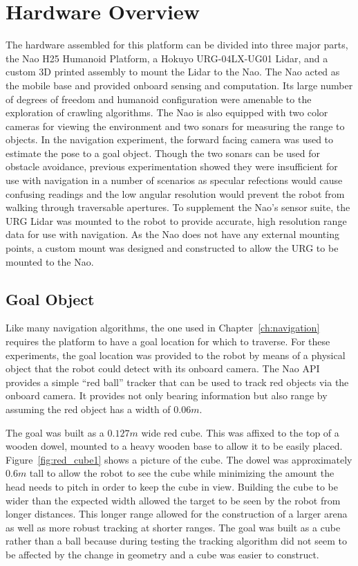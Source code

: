 \section{Hardware Overview}

The hardware assembled for this platform can be divided into three major parts,
the Nao H25 Humanoid Platform, a Hokuyo URG-04LX-UG01 Lidar, and a custom 3D
printed assembly to mount the Lidar to the Nao.
The Nao acted as the mobile base and provided onboard sensing and computation. 
Its large number of degrees of freedom and humanoid configuration were amenable
to the exploration of crawling algorithms.
The Nao is also equipped with two color cameras for viewing the environment
and two sonars for measuring the range to objects.
In the navigation experiment, the forward facing camera was used to estimate
the pose to a goal object. Though the two sonars can be used for obstacle
avoidance, previous experimentation showed they
were insufficient for use with navigation in a number of scenarios as
specular refections would cause confusing readings and the low angular
resolution would prevent the robot from walking through traversable apertures.
To supplement the Nao's sensor suite, the URG Lidar was mounted to the robot
to provide accurate, high resolution range data for use with navigation.
As the Nao does not have any external mounting points, a custom mount was
designed and constructed to allow the URG to be mounted to the Nao.

\subsection{Goal Object}
Like many navigation algorithms, the one used in Chapter~\ref{ch:navigation}
requires the platform to have a goal location for which to traverse.
For these experiments, the goal location was provided to the robot by means
of a physical object that the robot could detect with its onboard camera.
The Nao API provides a simple ``red ball'' tracker that can be used to track
red objects via the onboard camera. It provides not only bearing information
but also range by assuming the red object has a width of $0.06 m$.

The goal was built as a $0.127 m$ wide red cube. 
This was affixed to the top of a wooden dowel, mounted to a heavy wooden base to 
allow it to be easily placed.
Figure~\ref{fig:red_cube1} shows a picture of the cube.
The dowel was approximately $0.6 m$ tall to allow the robot to see the cube
while minimizing the amount the head needs to pitch in order to keep 
the cube in view. Building the cube to be wider than the 
expected width allowed the target to be seen by the robot from longer distances. 
This longer range allowed for the construction of a larger arena as well as more 
robust tracking at shorter ranges.
The goal was built as a cube rather than a ball because during testing 
the tracking algorithm did not seem to be affected by the change in geometry 
and a cube was easier to construct. 

